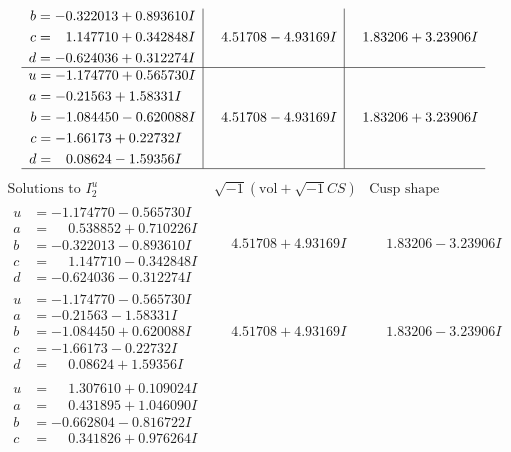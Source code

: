 \documentclass[1p]{elsarticle_modified}
\theoremstyle{definition}
\newcommand{\I}{\sqrt{-1}}
\begin{document}
$$\begin{array}{c|c|c}
\begin{aligned}
b &= -0.322013 + 0.893610 I \\
c &= \phantom{-}1.147710 + 0.342848 I \\
d &= -0.624036 + 0.312274 I\end{aligned}
 & \phantom{-}4.51708 - 4.93169 I & \phantom{-}1.83206 + 3.23906 I \\ \hline\begin{aligned}
u &= -1.174770 + 0.565730 I \\
a &= -0.21563 + 1.58331 I \\
b &= -1.084450 - 0.620088 I \\
c &= -1.66173 + 0.22732 I \\
d &= \phantom{-}0.08624 - 1.59356 I\end{aligned}
 & \phantom{-}4.51708 - 4.93169 I & \phantom{-}1.83206 + 3.23906 I\\
 \hline 
 \end{array}$$\newpage$$\begin{array}{c|c|c}  
\text{Solutions to }I^u_{2}& \I (\text{vol} + \sqrt{-1}CS) & \text{Cusp shape}\\
 \hline 
\begin{aligned}
u &= -1.174770 - 0.565730 I \\
a &= \phantom{-}0.538852 + 0.710226 I \\
b &= -0.322013 - 0.893610 I \\
c &= \phantom{-}1.147710 - 0.342848 I \\
d &= -0.624036 - 0.312274 I\end{aligned}
 & \phantom{-}4.51708 + 4.93169 I & \phantom{-}1.83206 - 3.23906 I \\ \hline\begin{aligned}
u &= -1.174770 - 0.565730 I \\
a &= -0.21563 - 1.58331 I \\
b &= -1.084450 + 0.620088 I \\
c &= -1.66173 - 0.22732 I \\
d &= \phantom{-}0.08624 + 1.59356 I\end{aligned}
 & \phantom{-}4.51708 + 4.93169 I & \phantom{-}1.83206 - 3.23906 I \\ \hline\begin{aligned}
u &= \phantom{-}1.307610 + 0.109024 I \\
a &= \phantom{-}0.431895 + 1.046090 I \\
b &= -0.662804 - 0.816722 I \\
c &= \phantom{-}0.341826 + 0.976264 I \\

\end{aligned}
\end{array}$$
\end{document}

